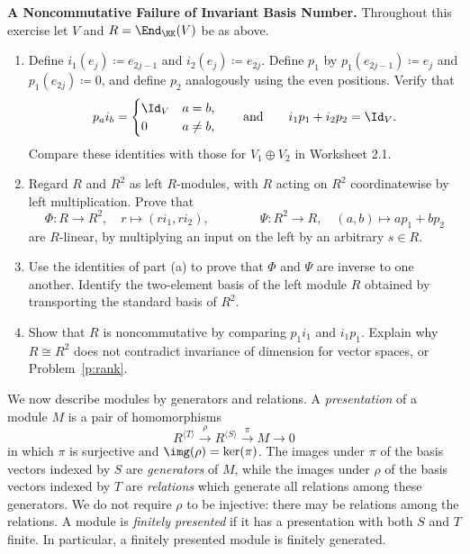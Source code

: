 \documentclass[12pt,reqno]{amsart}
\begin{document}
\begin{problems}
\item\label{p:ibn} \textbf{A Noncommutative Failure of Invariant Basis Number.} Throughout this exercise let $V$ and $R=\End_{\KK}(V)$ be as above.
\begin{enumerate}
\item Define $i_1(e_j)\coloneqq e_{2j-1}$ and $i_2(e_j)\coloneqq e_{2j}$. Define $p_1$ by $p_1(e_{2j-1})\coloneqq e_j$ and $p_1(e_{2j})\coloneqq0$, and define $p_2$ analogously using the even positions. Verify that
\[
p_ai_b=\begin{cases}\Id_V&a=b,\\0&a\neq b,\end{cases}
\qquad\text{and}\qquad i_1p_1+i_2p_2=\Id_V.
\]
Compare these identities with those for $V_1\oplus V_2$ in Worksheet 2.1.
\item Regard $R$ and $R^2$ as left $R$-modules, with $R$ acting on $R^2$ coordinatewise by left multiplication. Prove that
\[
\Phi:R\to R^2,\quad r\mapsto(ri_1,ri_2),\qquad\qquad\Psi:R^2\to R,\quad(a,b)\mapsto ap_1+bp_2
\]
are $R$-linear, by multiplying an input on the left by an arbitrary $s\in R$.
\item Use the identities of part (a) to prove that $\Phi$ and $\Psi$ are inverse to one another. Identify the two-element basis of the left module $R$ obtained by transporting the standard basis of $R^2$.
\item Show that $R$ is noncommutative by comparing $p_1i_1$ and $i_1p_1$. Explain why $R\cong R^2$ does not contradict invariance of dimension for vector spaces, or Problem~\ref{p:rank}.
\end{enumerate}
\end{problems}

\hrulefill

We now describe modules by generators and relations. A \emph{presentation} of a module $M$ is a pair of homomorphisms
\[
R^{\langle T\rangle}\xrightarrow{\ \rho\ }R^{\langle S\rangle}\xrightarrow{\ \pi\ }M\longrightarrow0
\]
in which $\pi$ is surjective and $\img(\rho)=\ker(\pi)$. The images under $\pi$ of the basis vectors indexed by $S$ are \emph{generators} of $M$, while the images under $\rho$ of the basis vectors indexed by $T$ are \emph{relations} which generate all relations among these generators. We do not require $\rho$ to be injective: there may be relations among the relations. A module is \emph{finitely presented} if it has a presentation with both $S$ and $T$ finite. In particular, a finitely presented module is finitely generated.
\end{document}
